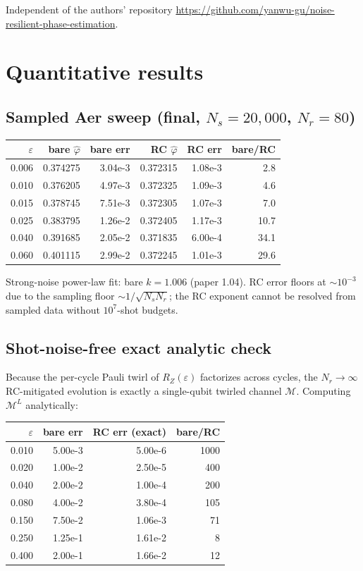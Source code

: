 \documentclass[11pt]{article}
\begin{document}
Independent of the authors' repository \url{https://github.com/yanwu-gu/noise-resilient-phase-estimation}.

\section{Quantitative results}

\subsection{Sampled Aer sweep (final, $N_s=20{,}000$, $N_r=80$)}
\begin{center}
\begin{tabular}{r r r r r r}
\toprule
$\varepsilon$ & bare $\hat\varphi$ & bare err & RC $\hat\varphi$ & RC err & bare/RC \\
\midrule
0.006 & 0.374275 & 3.04e-3 & 0.372315 & 1.08e-3 & 2.8 \\
0.010 & 0.376205 & 4.97e-3 & 0.372325 & 1.09e-3 & 4.6 \\
0.015 & 0.378745 & 7.51e-3 & 0.372305 & 1.07e-3 & 7.0 \\
0.025 & 0.383795 & 1.26e-2 & 0.372405 & 1.17e-3 & 10.7 \\
0.040 & 0.391685 & 2.05e-2 & 0.371835 & 6.00e-4 & 34.1 \\
0.060 & 0.401115 & 2.99e-2 & 0.372245 & 1.01e-3 & 29.6 \\
\bottomrule
\end{tabular}
\end{center}

Strong-noise power-law fit: bare $k=1.006$ (paper 1.04). RC error floors at $\sim 10^{-3}$ due to the sampling floor $\sim 1/\sqrt{N_s N_r}$; the RC exponent cannot be resolved from sampled data without $10^7$-shot budgets.

\subsection{Shot-noise-free exact analytic check}
Because the per-cycle Pauli twirl of $R_Z(\varepsilon)$ factorizes across cycles, the $N_r\to\infty$ RC-mitigated evolution is exactly a single-qubit twirled channel $\mathcal{M}$. Computing $\mathcal{M}^L$ analytically:

\begin{center}
\begin{tabular}{r r r r}
\toprule
$\varepsilon$ & bare err & RC err (exact) & bare/RC \\
\midrule
0.010 & 5.00e-3 & 5.00e-6 & 1000 \\
0.020 & 1.00e-2 & 2.50e-5 & 400 \\
0.040 & 2.00e-2 & 1.00e-4 & 200 \\
0.080 & 4.00e-2 & 3.80e-4 & 105 \\
0.150 & 7.50e-2 & 1.06e-3 & 71 \\
0.250 & 1.25e-1 & 1.61e-2 & 8 \\
0.400 & 2.00e-1 & 1.66e-2 & 12 \\
\bottomrule
\end{tabular}
\end{center}
\end{document}
